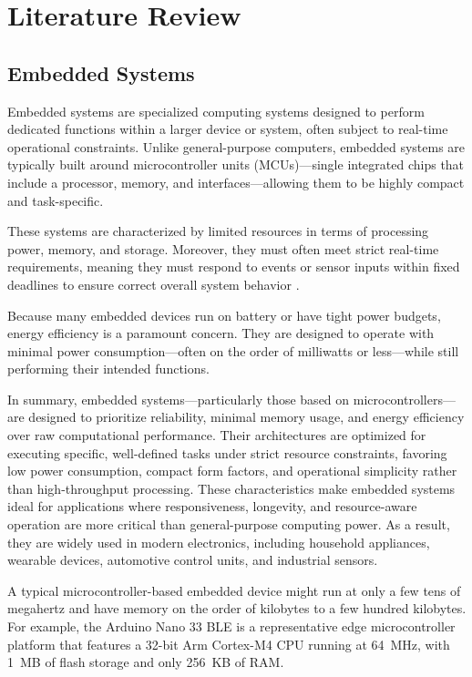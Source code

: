 \chapter{Literature Review}




\section{Embedded Systems}

Embedded systems are specialized computing systems designed to perform dedicated functions within a larger device or system, often subject to real-time operational constraints. Unlike general-purpose computers, embedded systems are typically built around microcontroller units (MCUs)---single integrated chips that include a processor, memory, and interfaces---allowing them to be highly compact and task-specific.

These systems are characterized by limited resources in terms of processing power, memory, and storage. Moreover, they must often meet strict real-time requirements, meaning they must respond to events or sensor inputs within fixed deadlines to ensure correct overall system behavior \cite{techtarget_embedded_system}.

Because many embedded devices run on battery or have tight power budgets, energy efficiency is a paramount concern. They are designed to operate with minimal power consumption---often on the order of milliwatts or less---while still performing their intended functions.

In summary, embedded systems—particularly those based on microcontrollers—are designed to prioritize reliability, minimal memory usage, and energy efficiency over raw computational performance. Their architectures are optimized for executing specific, well-defined tasks under strict resource constraints, favoring low power consumption, compact form factors, and operational simplicity rather than high-throughput processing. These characteristics make embedded systems ideal for applications where responsiveness, longevity, and resource-aware operation are more critical than general-purpose computing power. As a result, they are widely used in modern electronics, including household appliances, wearable devices, automotive control units, and industrial sensors.


A typical microcontroller-based embedded device might run at only a few tens of megahertz and have memory on the order of kilobytes to a few hundred kilobytes. For example, the Arduino Nano 33 BLE is a representative edge microcontroller platform that features a 32-bit Arm Cortex-M4 CPU running at 64~MHz, with 1~MB of flash storage and only 256~KB of RAM.


